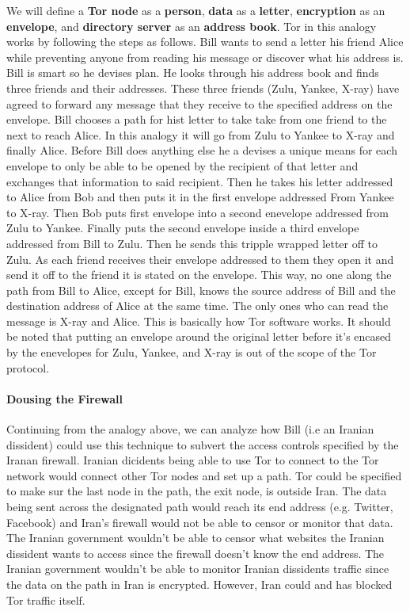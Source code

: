 \documentclass[11pt]{article}
\begin{document}
\begin{multicols}{2}
We will define a \textbf{Tor node} as a \textbf{person}, \textbf{data} as a
\textbf{letter}, \textbf{encryption} as an \textbf{envelope}, and
\textbf{directory server} as an \textbf{address book}.  Tor in this analogy works
by following the steps as follows. Bill wants to send a letter his friend Alice
while preventing anyone from reading his message or discover what his address is.  Bill
is smart so he devises plan. He looks through his address book and finds three
friends and their addresses.  These three friends (Zulu, Yankee, X-ray)
have agreed to forward any message that they receive to the
specified address on the envelope. Bill chooses a path for hist letter to take take from one friend
to the next to reach Alice. In this analogy it will go from Zulu to Yankee to
X-ray and finally Alice. Before Bill does anything else he a devises a unique
means for each envelope to only be able to be opened by the recipient of that
letter and exchanges that information to said recipient.  Then he takes his letter addressed to Alice from Bob and then
puts it in the first envelope addressed From Yankee to X-ray.  Then Bob puts first
envelope into a second enevelope addressed from Zulu to Yankee.  Finally puts the second
envelope inside a third envelope addressed from Bill to Zulu.  Then he sends
this tripple wrapped letter off to Zulu.  As each friend receives their envelope addressed to them
they open it and send it off to the friend it is stated on the envelope.  This
way, no one along the path from Bill to Alice, except for Bill, knows the source address of
Bill and the destination address of Alice at the same time.  The
only ones who can read the message is X-ray and Alice. This is basically how Tor
software works. It should be noted that putting an envelope around the original letter
before it's encased by the enevelopes for Zulu, Yankee, and X-ray is out of
the scope of the Tor protocol.

\paragraph{Dousing the Firewall}

Continuing from the analogy above, we can analyze how Bill (i.e an Iranian
dissident) could use this technique to subvert the access controls specified by
the Iranan firewall. Iranian dicidents being able to use Tor to connect to the
Tor network would connect other Tor nodes and set up a path. Tor could be
specified to make sur the last node in the path, the exit node, is outside Iran.
\cite{Tor:SpecificExitNode, Tor:FAQ} The data being sent across the designated
path would reach its end address (e.g.  Twitter, Facebook) and Iran's firewall
would not be able to censor or monitor that data. The Iranian government
wouldn't be able to censor what websites the Iranian dissident wants to access
since the firewall doesn't know the end address. The Iranian government wouldn't
be able to monitor Iranian dissidents traffic since the data on the path in Iran
is encrypted. However, Iran could and has blocked Tor traffic
itself.


\end{multicols}
\end{document}
